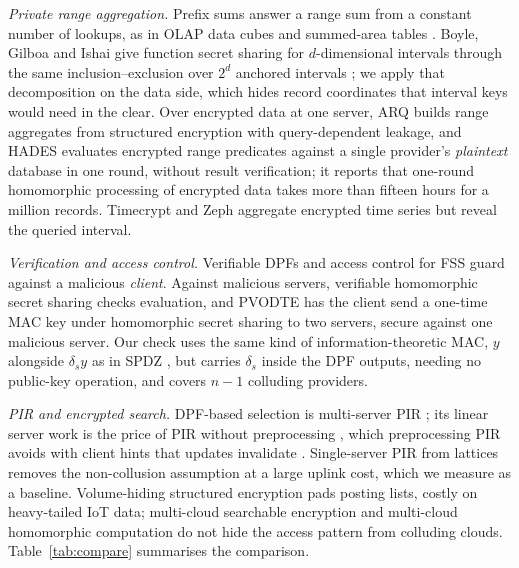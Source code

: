 \emph{Private range aggregation.} Prefix sums answer a range sum from a
constant number of lookups, as in OLAP data cubes \citep{ho1997range} and
summed-area tables \citep{crow1984summed}. Boyle, Gilboa and Ishai give
function secret sharing for $d$-dimensional intervals through the same
inclusion--exclusion over $2^d$ anchored intervals
\citep[Cor.~3.4]{boyle2016function}; we apply that decomposition on the data
side, which hides record coordinates that interval keys would need in the
clear. Over encrypted data at one server, ARQ \citep{espiritu2022arq} builds
range aggregates from structured encryption with query-dependent leakage, and
HADES \citep{liu2025hades} evaluates encrypted range predicates against a
single provider's \emph{plaintext} database in one round, without result
verification; it reports that one-round homomorphic processing of encrypted
data takes more than fifteen hours for a million records. Timecrypt
\citep{timecrypt} and Zeph \citep{zeph} aggregate encrypted time series but
reveal the queried interval.

\emph{Verification and access control.} Verifiable DPFs
\citep{decastro2022lightweight} and access control for FSS
\citep{pacl,ji2023finegrained} guard against a malicious \emph{client}. Against
malicious servers, verifiable homomorphic secret sharing
\citep{choudhuri2024vehss} checks evaluation, and PVODTE \citep{li2026silent}
has the client send a one-time MAC key under homomorphic secret sharing to two
servers, secure against one malicious server. Our check uses the same kind of
information-theoretic MAC, $y$ alongside $\delta_s y$ as in SPDZ
\citep{damgard2012spdz}, but carries $\delta_s$ inside the DPF outputs, needing
no public-key operation, and covers $n-1$ colluding providers.

\emph{PIR and encrypted search.} DPF-based selection is multi-server PIR
\citep{chor1998private}; its linear server work is the price of PIR without
preprocessing \citep{beimel2000reducing}, which preprocessing PIR avoids with
client hints that updates invalidate \citep{corrigan2020private}. Single-server
PIR from lattices \citep{angel2018pir,menon2022spiral} removes the
non-collusion assumption at a large uplink cost, which we measure as a
baseline. Volume-hiding structured encryption
\citep{kamara2019computationally,patel2019mitigating} pads posting lists,
costly on heavy-tailed IoT data; multi-cloud searchable encryption
\citep{xu2021privacy,xu2023symmetric} and multi-cloud homomorphic computation
\citep{wang2020shamc} do not hide the access pattern from colluding clouds.
Table~\ref{tab:compare} summarises the comparison.


